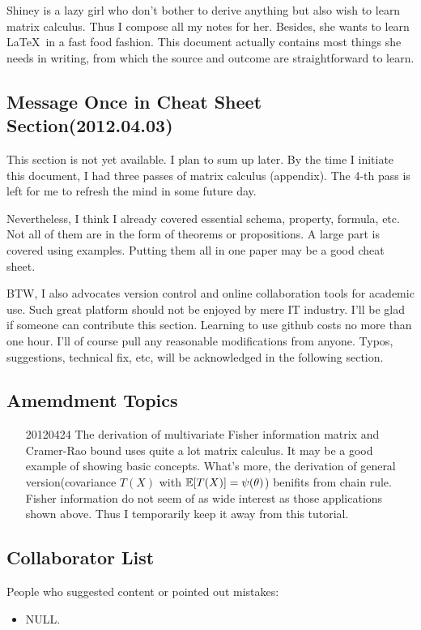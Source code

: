 Shiney is a lazy girl who don't bother to derive
anything but also wish to learn matrix calculus. 
Thus I compose all my notes for her. Besides, she 
wants to learn \LaTeX ~in a fast food fashion. This 
document actually contains most things she needs 
in writing, from which the source and outcome are 
straightforward to learn. 


\subsection*{Message Once in Cheat Sheet Section(2012.04.03)}

This section is not yet available. I plan to sum up later. By the time 
I initiate this document, I had three passes of matrix calculus
(appendix). The 4-th 
pass is left for me to refresh the mind in some future day. 

Nevertheless, I think I already covered essential schema, property, 
formula, etc. Not all of them are in the form of theorems or propositions. 
A large part is covered using examples. Putting them all in one paper 
may be a good cheat sheet. 

BTW, I also advocates version control and online 
collaboration tools for academic use. Such great platform 
should not be enjoyed by mere IT industry. I'll 
be glad if someone can contribute this section. Learning 
to use github costs no more than one hour. I'll of course 
pull any reasonable modifications from anyone. 
Typos, suggestions, technical fix, etc, will be acknowledged 
in the following section. 

\subsection*{Amemdment Topics}
\begin{itemize}
	\item [20120424] The derivation of multivariate Fisher information matrix
	and Cramer-Rao bound uses quite a lot matrix calculus. It 
	may be a good example of showing basic concepts. What's more, 
	the derivation of general version(covariance $T(X)$ with 
	$\mathbb{E}[T(X)]=\psi(\theta)$) benifits from chain rule. Fisher information 
	do not seem of as wide interest as those applications shown above.
	Thus I temporarily keep it away from this tutorial.  
\end{itemize}

\subsection*{Collaborator List}

People who suggested content or pointed out mistakes:
\begin{itemize}
	\item NULL. 
\end{itemize}


